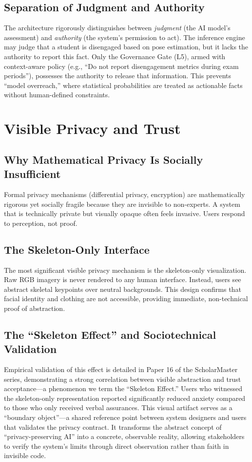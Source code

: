 \documentclass[conference]{IEEEtran}
\begin{document}
\subsection{Separation of Judgment and Authority}
The architecture rigorously distinguishes between \textit{judgment} (the AI model's assessment) and \textit{authority} (the system's permission to act). The inference engine may judge that a student is disengaged based on pose estimation, but it lacks the authority to report this fact. Only the Governance Gate (L5), armed with context-aware policy (e.g., ``Do not report disengagement metrics during exam periods''), possesses the authority to release that information. This prevents ``model overreach,'' where statistical probabilities are treated as actionable facts without human-defined constraints.

\section{Visible Privacy and Trust}

\subsection{Why Mathematical Privacy Is Socially Insufficient}
Formal privacy mechanisms (differential privacy, encryption) are mathematically rigorous yet socially fragile because they are invisible to non-experts. A system that is technically private but visually opaque often feels invasive. Users respond to perception, not proof.

\subsection{The Skeleton-Only Interface}
The most significant visible privacy mechanism is the skeleton-only visualization. Raw RGB imagery is never rendered to any human interface. Instead, users see abstract skeletal keypoints over neutral backgrounds. This design confirms that facial identity and clothing are not accessible, providing immediate, non-technical proof of abstraction.

\subsection{The ``Skeleton Effect'' and Sociotechnical Validation}
Empirical validation of this effect is detailed in Paper 16 of the ScholarMaster series, demonstrating a strong correlation between visible abstraction and trust acceptance---a phenomenon we term the ``Skeleton Effect.'' Users who witnessed the skeleton-only representation reported significantly reduced anxiety compared to those who only received verbal assurances. This visual artifact serves as a ``boundary object''---a shared reference point between system designers and users that validates the privacy contract. It transforms the abstract concept of ``privacy-preserving AI'' into a concrete, observable reality, allowing stakeholders to verify the system's limits through direct observation rather than faith in invisible code.
\end{document}
